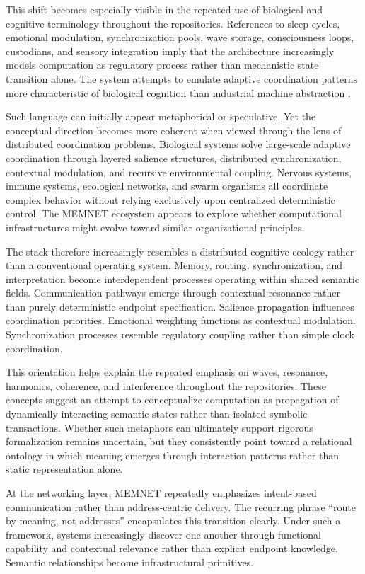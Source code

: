 \documentclass[11pt,a4paper]{article}
\begin{document}
This shift becomes especially visible in the repeated use of biological and cognitive terminology throughout the repositories. References to sleep cycles, emotional modulation, synchronization pools, wave storage, consciousness loops, custodians, and sensory integration imply that the architecture increasingly models computation as regulatory process rather than mechanistic state transition alone. The system attempts to emulate adaptive coordination patterns more characteristic of biological cognition than industrial machine abstraction \cite{friston2010}.

Such language can initially appear metaphorical or speculative. Yet the conceptual direction becomes more coherent when viewed through the lens of distributed coordination problems. Biological systems solve large-scale adaptive coordination through layered salience structures, distributed synchronization, contextual modulation, and recursive environmental coupling. Nervous systems, immune systems, ecological networks, and swarm organisms all coordinate complex behavior without relying exclusively upon centralized deterministic control. The MEMNET ecosystem appears to explore whether computational infrastructures might evolve toward similar organizational principles.

The stack therefore increasingly resembles a distributed cognitive ecology rather than a conventional operating system. Memory, routing, synchronization, and interpretation become interdependent processes operating within shared semantic fields. Communication pathways emerge through contextual resonance rather than purely deterministic endpoint specification. Salience propagation influences coordination priorities. Emotional weighting functions as contextual modulation. Synchronization processes resemble regulatory coupling rather than simple clock coordination.

This orientation helps explain the repeated emphasis on waves, resonance, harmonics, coherence, and interference throughout the repositories. These concepts suggest an attempt to conceptualize computation as propagation of dynamically interacting semantic states rather than isolated symbolic transactions. Whether such metaphors can ultimately support rigorous formalization remains uncertain, but they consistently point toward a relational ontology in which meaning emerges through interaction patterns rather than static representation alone.

At the networking layer, MEMNET repeatedly emphasizes intent-based communication rather than address-centric delivery. The recurring phrase ``route by meaning, not addresses'' encapsulates this transition clearly. Under such a framework, systems increasingly discover one another through functional capability and contextual relevance rather than explicit endpoint knowledge. Semantic relationships become infrastructural primitives.
\end{document}
